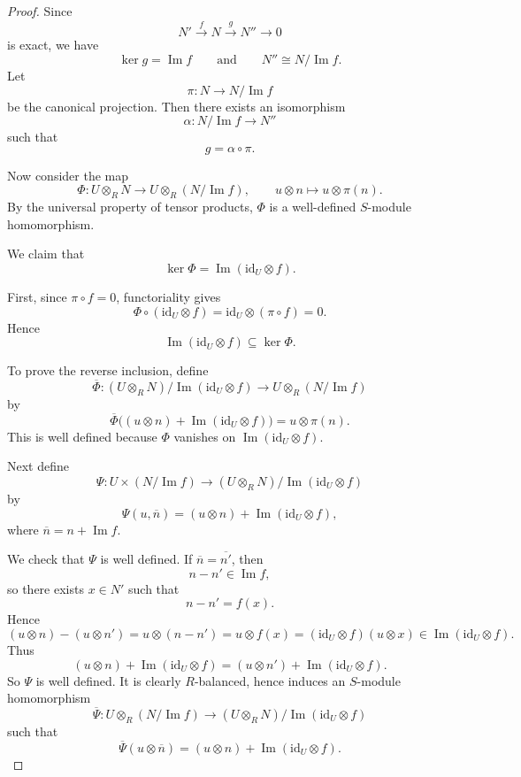 \begin{proof}
    Since
    \[
        N' \xrightarrow{\,f\,} N \xrightarrow{\,g\,} N'' \longrightarrow 0
    \]
    is exact, we have
    \[
        \ker g=\operatorname{Im} f
        \qquad\text{and}\qquad
        N''\cong N/\operatorname{Im} f.
    \]
    Let
    \[
        \pi:N\longrightarrow N/\operatorname{Im} f
    \]
    be the canonical projection. Then there exists an isomorphism
    \[
        \alpha:N/\operatorname{Im} f \longrightarrow N''
    \]
    such that
    \[
        g=\alpha\circ \pi.
    \]

    Now consider the map
    \[
        \Phi:U\otimes_R N \longrightarrow U\otimes_R (N/\operatorname{Im} f),
        \qquad
        u\otimes n \longmapsto u\otimes \pi(n).
    \]
    By the universal property of tensor products, $\Phi$ is a well-defined $S$-module homomorphism.

    We claim that
    \[
        \ker \Phi=\operatorname{Im}(\mathrm{id}_U\otimes f).
    \]

    First, since $\pi\circ f=0$, functoriality gives
    \[
        \Phi\circ (\mathrm{id}_U\otimes f)
        =
        \mathrm{id}_U\otimes (\pi\circ f)
        =
        0.
    \]
    Hence
    \[
        \operatorname{Im}(\mathrm{id}_U\otimes f)\subseteq \ker\Phi.
    \]

    To prove the reverse inclusion, define
    \[
        \overline{\Phi}:(U\otimes_R N)/\operatorname{Im}(\mathrm{id}_U\otimes f)
        \longrightarrow
        U\otimes_R (N/\operatorname{Im} f)
    \]
    by
    \[
        \overline{\Phi}\bigl((u\otimes n)+\operatorname{Im}(\mathrm{id}_U\otimes f)\bigr)
        =
        u\otimes \pi(n).
    \]
    This is well defined because $\Phi$ vanishes on $\operatorname{Im}(\mathrm{id}_U\otimes f)$.

    Next define
    \[
        \Psi:U\times (N/\operatorname{Im} f)\longrightarrow
        (U\otimes_R N)/\operatorname{Im}(\mathrm{id}_U\otimes f)
    \]
    by
    \[
        \Psi(u,\overline{n})
        =
        (u\otimes n)+\operatorname{Im}(\mathrm{id}_U\otimes f),
    \]
    where $\overline{n}=n+\operatorname{Im} f$.

    We check that $\Psi$ is well defined. If $\overline{n}=\overline{n'}$, then
    \[
        n-n'\in\operatorname{Im} f,
    \]
    so there exists $x\in N'$ such that
    \[
        n-n'=f(x).
    \]
    Hence
    \[
        (u\otimes n)-(u\otimes n')
        =
        u\otimes (n-n')
        =
        u\otimes f(x)
        =
        (\mathrm{id}_U\otimes f)(u\otimes x)
        \in\operatorname{Im}(\mathrm{id}_U\otimes f).
    \]
    Thus
    \[
        (u\otimes n)+\operatorname{Im}(\mathrm{id}_U\otimes f)
        =
        (u\otimes n')+\operatorname{Im}(\mathrm{id}_U\otimes f).
    \]
    So $\Psi$ is well defined. It is clearly $R$-balanced, hence induces an $S$-module homomorphism
    \[
        \overline{\Psi}:U\otimes_R (N/\operatorname{Im} f)
        \longrightarrow
        (U\otimes_R N)/\operatorname{Im}(\mathrm{id}_U\otimes f)
    \]
    such that
    \[
        \overline{\Psi}(u\otimes \overline{n})
        =
        (u\otimes n)+\operatorname{Im}(\mathrm{id}_U\otimes f).
    \]


\end{proof}
